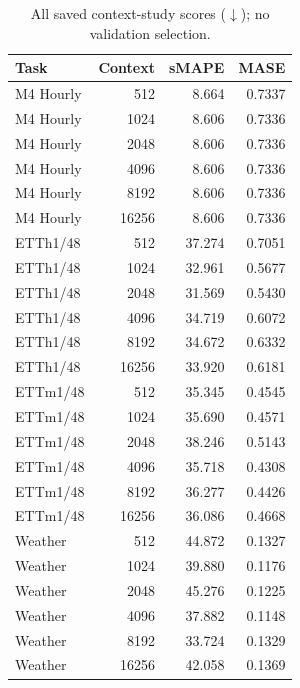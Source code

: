 \begin{table}[!htbp]
\centering
\caption{All saved context-study scores ($\downarrow$); no validation selection.}
\label{tab:contexts}
\small
\setlength{\tabcolsep}{3.5pt}
\begin{tabular}{lrrr}
\hline
Task & Context & sMAPE & MASE \\
\hline
M4 Hourly & 512 & 8.664 & 0.7337 \\
M4 Hourly & 1024 & 8.606 & 0.7336 \\
M4 Hourly & 2048 & 8.606 & 0.7336 \\
M4 Hourly & 4096 & 8.606 & 0.7336 \\
M4 Hourly & 8192 & 8.606 & 0.7336 \\
M4 Hourly & 16256 & 8.606 & 0.7336 \\
ETTh1/48 & 512 & 37.274 & 0.7051 \\
ETTh1/48 & 1024 & 32.961 & 0.5677 \\
ETTh1/48 & 2048 & 31.569 & 0.5430 \\
ETTh1/48 & 4096 & 34.719 & 0.6072 \\
ETTh1/48 & 8192 & 34.672 & 0.6332 \\
ETTh1/48 & 16256 & 33.920 & 0.6181 \\
ETTm1/48 & 512 & 35.345 & 0.4545 \\
ETTm1/48 & 1024 & 35.690 & 0.4571 \\
ETTm1/48 & 2048 & 38.246 & 0.5143 \\
ETTm1/48 & 4096 & 35.718 & 0.4308 \\
ETTm1/48 & 8192 & 36.277 & 0.4426 \\
ETTm1/48 & 16256 & 36.086 & 0.4668 \\
Weather & 512 & 44.872 & 0.1327 \\
Weather & 1024 & 39.880 & 0.1176 \\
Weather & 2048 & 45.276 & 0.1225 \\
Weather & 4096 & 37.882 & 0.1148 \\
Weather & 8192 & 33.724 & 0.1329 \\
Weather & 16256 & 42.058 & 0.1369 \\
\hline
\end{tabular}
\end{table}
